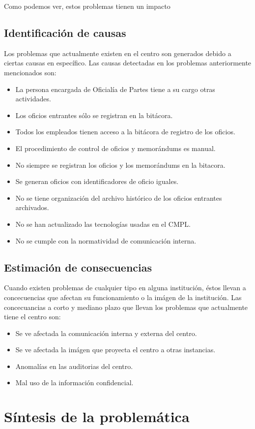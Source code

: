 Como podemos ver, estos problemas tienen un impacto
	\subsection{Identificación de causas}
	Los problemas que actualmente existen en el centro son generados debido a ciertas causas en específico. Las causas detectadas en los problemas anteriormente mencionados son:

\begin{itemize}
	
	\item La persona encargada de Oficialía de Partes tiene a su cargo otras actividades.
	\item Los oficios entrantes sólo se registran en la bitácora.
	\item Todos los empleados tienen acceso a la bitácora de registro de los oficios.
	\item El procedimiento de control de oficios y memorándums es manual.
	\item No siempre se registran los oficios y los memorándums en la bitacora.
	\item Se generan oficios con identificadores de oficio iguales.
	\item No se tiene organización del archivo histórico de los oficios entrantes archivados.
	\item No se han actualizado las tecnologías usadas en el CMPL.
	\item No se cumple con la normatividad de comunicación interna.
	
\end{itemize}
	\subsection{Estimación de consecuencias}
	Cuando existen problemas de cualquier tipo en alguna institución, éstos llevan a concecuencias que afectan su funcionamiento o la imágen de la institución. Las concecuancias a corto y mediano plazo que llevan los problemas que actualmente tiene el centro son:

\begin{itemize}
	\item Se ve afectada la comunicación interna y externa del centro.
	\item Se ve afectada la imágen que proyecta el centro a otras instancias.
	\item Anomalías en las auditorias del centro.
	\item Mal uso de la información confidencial.
\end{itemize}
\section{Síntesis de la problemática}





